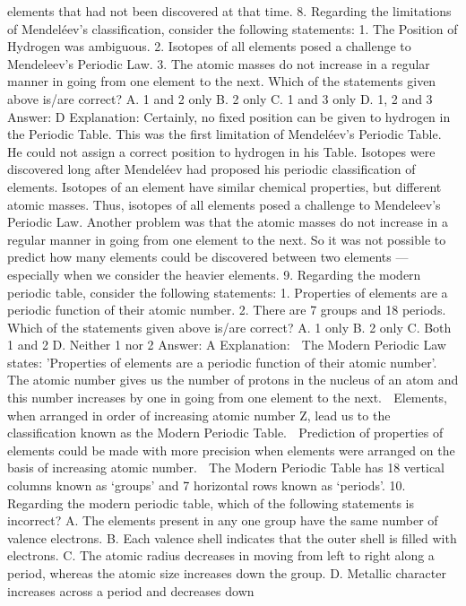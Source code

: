 elements that had not been discovered at that time.
8. Regarding the limitations of Mendeléev’s classification,
consider the following statements:
1. The Position of Hydrogen was ambiguous.
2. Isotopes of all elements posed a challenge to Mendeleev’s Periodic
Law.
3. The atomic masses do not increase in a regular manner in going
from one element to the next.
Which of the statements given above is/are correct?
A. 1 and 2 only
B. 2 only
C. 1 and 3 only
D. 1, 2 and 3
Answer: D
Explanation:
Certainly, no fixed position can be given to hydrogen in the Periodic
Table. This was the first limitation of Mendeléev’s Periodic Table.
He could not assign a correct position to hydrogen in his Table.
Isotopes were discovered long after Mendeléev had proposed his
periodic classification of elements. Isotopes of an element have
similar chemical properties, but different atomic masses. Thus,
isotopes of all elements posed a challenge to Mendeleev’s Periodic
Law.
Another problem was that the atomic masses do not increase in a
regular manner in going from one element to the next. So it was not
possible to predict how many elements could be discovered between
two elements — especially when we consider the heavier elements.
9. Regarding the modern periodic table, consider the following
statements:
1. Properties of elements are a periodic function of their atomic
number.
2. There are 7 groups and 18 periods.
Which of the statements given above is/are correct?
A. 1 only
B. 2 only
C. Both 1 and 2
D. Neither 1 nor 2
Answer: A
Explanation:
 The Modern Periodic Law states: 'Properties of elements are
a periodic function of their atomic number'.
 The atomic number gives us the number of protons in the
nucleus of an atom and this number increases by one in going
from one element to the next.
 Elements, when arranged in order of increasing atomic number
Z, lead us to the classification known as the Modern Periodic
Table.
 Prediction of properties of elements could be made with more
precision when elements were arranged on the basis of
increasing atomic number.
 The Modern Periodic Table has 18 vertical columns known as
‘groups’ and 7 horizontal rows known as ‘periods’.
10. Regarding the modern periodic table, which of the following
statements is incorrect?
A. The elements present in any one group have the same number of
valence electrons.
B. Each valence shell indicates that the outer shell is filled with
electrons.
C. The atomic radius decreases in moving from left to right along a
period, whereas the atomic size increases down the group.
D. Metallic character increases across a period and decreases down
